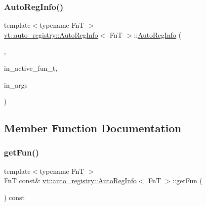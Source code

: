\mbox{\label{structvt_1_1auto__registry_1_1_auto_reg_info_a27b04381553c1a745ababc3120eb6dde}} 
\subsubsection{\texorpdfstring{Auto\+Reg\+Info()}{AutoRegInfo()}\hspace{0.1cm}{\footnotesize\ttfamily [2/2]}}
{\footnotesize\ttfamily template$<$typename FnT $>$ \\
\hyperlink{structvt_1_1auto__registry_1_1_auto_reg_info}{vt\+::auto\+\_\+registry\+::\+Auto\+Reg\+Info}$<$ FnT $>$\+::\hyperlink{structvt_1_1auto__registry_1_1_auto_reg_info}{Auto\+Reg\+Info} (\begin{DoxyParamCaption}\item[{Num\+Args\+Tag\+Type}]{,  }\item[{FnT}]{in\+\_\+active\+\_\+fun\+\_\+t,  }\item[{\hyperlink{namespacevt_1_1auto__registry_aebda1d9d765bc9147dc654ad0712c936}{Num\+Args\+Type} const \&}]{in\+\_\+args }\end{DoxyParamCaption})\hspace{0.3cm}{\ttfamily [inline]}}



\subsection{Member Function Documentation}
\mbox{\label{structvt_1_1auto__registry_1_1_auto_reg_info_a04bc8afbcaa80c63573e96507b60f364}} 
\subsubsection{\texorpdfstring{get\+Fun()}{getFun()}}
{\footnotesize\ttfamily template$<$typename FnT $>$ \\
FnT const\& \hyperlink{structvt_1_1auto__registry_1_1_auto_reg_info}{vt\+::auto\+\_\+registry\+::\+Auto\+Reg\+Info}$<$ FnT $>$\+::get\+Fun (\begin{DoxyParamCaption}{ }\end{DoxyParamCaption}) const\hspace{0.3cm}{\ttfamily [inline]}}

